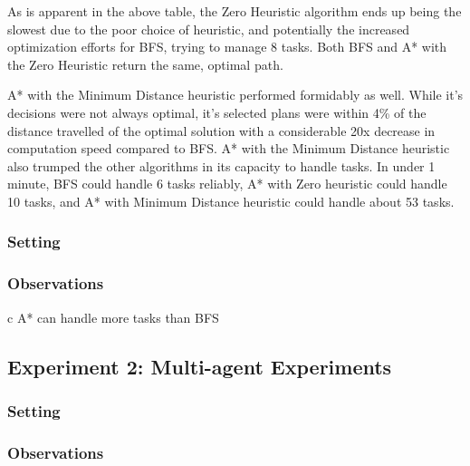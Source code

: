 \documentclass[11pt]{article}
\begin{document}
As is apparent in the above table, the Zero Heuristic algorithm ends up being the slowest due to the poor choice of heuristic, and potentially the increased optimization efforts for BFS, trying to manage 8 tasks. Both BFS and A* with the Zero Heuristic return the same, optimal path. 

A* with the Minimum Distance heuristic performed formidably as well. While it's decisions were not always optimal, it's selected plans were within 4\% of the distance travelled of the optimal solution with a considerable 20x decrease in computation speed compared to BFS. A* with the Minimum Distance heuristic also trumped the other algorithms in its capacity to handle tasks. In under 1 minute, BFS could handle 6 tasks reliably, A* with Zero heuristic could handle 10 tasks, and A* with Minimum Distance heuristic could handle about 53 tasks. 

\subsubsection{Setting}

\subsubsection{Observations}
c
A* can handle more tasks than BFS


\subsection{Experiment 2: Multi-agent Experiments}

\subsubsection{Setting}

\subsubsection{Observations}
\end{document}
